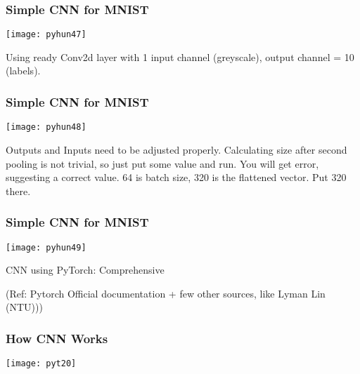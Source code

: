 \begin{frame}[fragile] \frametitle{Simple CNN for MNIST}
\begin{center}
\texttt{[image: pyhun47]}
\end{center}
Using ready Conv2d layer with 1 input channel (greyscale), output channel = 10 (labels).
\end{frame}


\begin{frame}[fragile] \frametitle{Simple CNN for MNIST}
\begin{center}
\texttt{[image: pyhun48]}
\end{center}

Outputs and Inputs need to be adjusted properly.  Calculating size after second pooling is not trivial, so just put some value and run. You will get error, suggesting a correct value. 64 is batch size, 320 is the flattened vector. Put 320 there.
\end{frame}

\begin{frame}[fragile] \frametitle{Simple CNN for MNIST}
\begin{center}
\texttt{[image: pyhun49]}
\end{center}


\end{frame}






\begin{frame}
  \begin{center}
    {\Large CNN using PyTorch: Comprehensive}
    
\tiny{(Ref: Pytorch Official documentation + few other sources, like Lyman Lin (NTU)))}
  \end{center}
\end{frame}



\begin{frame}[fragile] \frametitle{How CNN Works}
\begin{center}
\texttt{[image: pyt20]}
\end{center}

\end{frame}

